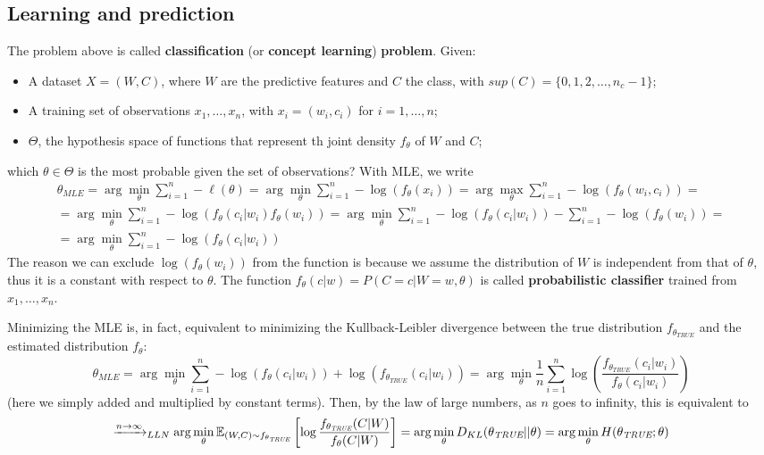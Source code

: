 \subsection{Learning and prediction} The problem above is called \textbf{classification} (or \textbf{concept learning}) \textbf{problem}. Given: 
\begin{itemize}[noitemsep]
    \item A dataset $X = (W,C)$, where $W$ are the predictive features and $C$ the class, with $sup(C) = \{0,1,2,\ldots,n_c - 1\}$;
    \item A training set of observations $x_1, \ldots, x_n$, with $x_i = (w_i, c_i)$ for $i = 1,\ldots,n$;
    \item $\Theta$, the hypothesis space of functions that represent th joint density $f_{\theta}$ of $W$ and $C$;
\end{itemize}
which $\theta \in \Theta$ is the most probable given the set of observations? With MLE, we write
\begin{gather*}
    \theta_{MLE} = \arg \min_{\theta} \sum_{i=1}^n - \ell(\theta) = \arg \min_{\theta} \sum_{i=1}^n - \log (f_{\theta}(x_i)) = \arg \max_{\theta} \sum_{i=1}^n - \log (f_{\theta}(w_i, c_i)) = \\
    = \arg \min_{\theta} \sum_{i=1}^n - \log (f_{\theta}(c_i | w_i) f_{\theta}(w_i)) = \arg \min_{\theta} \sum_{i=1}^n - \log (f_{\theta}(c_i | w_i)) - \sum_{i=1}^n - \log (f_{\theta}(w_i)) = \\
    = \arg \min_{\theta} \sum_{i=1}^n - \log (f_{\theta}(c_i | w_i))
\end{gather*}
The reason we can exclude $\log(f_{\theta}(w_i))$ from the function is because we assume the distribution of $W$ is independent from that of $\theta$, thus it is a constant with respect to $\theta$. The function $f_{\theta}(c|w) = P(C = c|W = w, \theta)$ is called \textbf{probabilistic classifier} trained from $x_1, \ldots, x_n$. 

Minimizing the MLE is, in fact, equivalent to minimizing the Kullback-Leibler divergence between the true distribution $f_{\theta _{\textit{TRUE}}}$ and the estimated distribution $f_{\theta}$:
\begin{equation*}
    \theta_{MLE} = \arg \min_{\theta} \sum_{i=1}^n - \log (f_{\theta}(c_i | w_i)) + \log (f_{\theta _{\textit{TRUE}}}(c_i|w_i)) = \arg \min_{\theta} \frac{1}{n} \sum_{i=1}^n \log \left (\frac{f_{\theta_{\textit{TRUE}}}(c_i|w_i)}{f_{\theta}(c_i|w_i)} \right )
\end{equation*}
(here we simply added and multiplied by constant terms). Then, by the law of large numbers, as $n$ goes to infinity, this is equivalent to
\begin{equation*}
    \xrightarrow{n \to \infty}_{LLN} \arg \min_{\theta} \mathbb{E}_{(W,C) \sim f_{\theta_{\textit{TRUE}}}}\left[\log \frac{f_{\theta_{\textit{TRUE}}}(C|W)}{f_{\theta}(C|W)}\right] = \arg \min_{\theta} D_{KL}(\theta_{\textit{TRUE}} || \theta) = \arg \min_{\theta} H(\theta_{\textit{TRUE}}; \theta)
\end{equation*}

